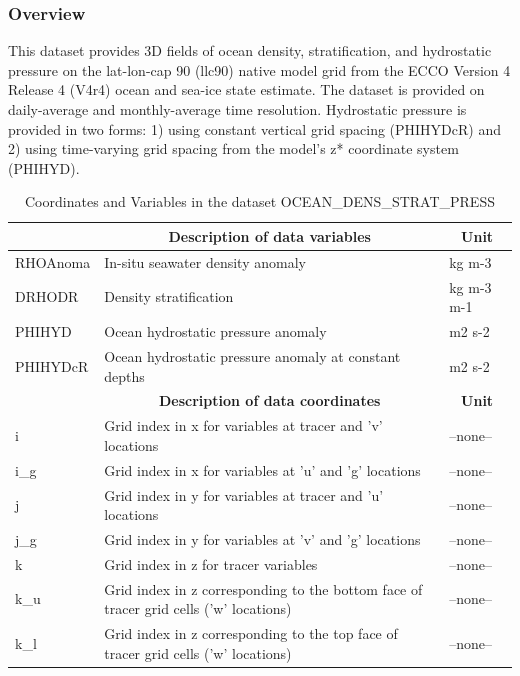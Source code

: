 \subsubsection{Overview}
This dataset provides 3D fields of ocean density, stratification, and hydrostatic pressure on the lat-lon-cap 90 (llc90) native model grid from the ECCO Version 4 Release 4 (V4r4) ocean and sea-ice state estimate. The dataset is provided on daily-average and monthly-average time resolution. Hydrostatic pressure is provided in two forms: 1) using constant vertical grid spacing (PHIHYDcR) and 2) using time-varying grid spacing from the model's z* coordinate system (PHIHYD). 
\begin{longtable}{|m{}|m{}|m{}|}
\caption{Coordinates and Variables in the dataset OCEAN\_DENS\_STRAT\_PRESS}
\label{tab:table-OCEAN_DENS_STRAT_PRESS-fields} \\ 
\hline \endhead \hline \endfoot
\rowcolor{lightgray} \multicolumn{1}{|c|}{\textbf{Variables}} & \multicolumn{1}{|c|}{\textbf{Description of data variables}} &  \multicolumn{1}{|c|}{\textbf{Unit}}\\ \hline
RHOAnoma &In-situ seawater density anomaly &kg m-3  \\ \hline
DRHODR &Density stratification &kg m-3 m-1  \\ \hline
PHIHYD &Ocean hydrostatic pressure anomaly &m2 s-2  \\ \hline
PHIHYDcR &Ocean hydrostatic pressure anomaly at constant depths &m2 s-2  \\ \hline
\rowcolor{lightgray} \multicolumn{1}{|c|}{\textbf{Coordinates}} & \multicolumn{1}{|c|}{\textbf{Description of data coordinates}} &  \multicolumn{1}{|c|}{\textbf{Unit}}\\ \hline
i &Grid index in x for variables at tracer and 'v' locations &--none--  \\ \hline
i\_g &Grid index in x for variables at 'u' and 'g' locations &--none--  \\ \hline
j &Grid index in y for variables at tracer and 'u' locations &--none--  \\ \hline
j\_g &Grid index in y for variables at 'v' and 'g' locations &--none--  \\ \hline
k &Grid index in z for tracer variables &--none--  \\ \hline
k\_u &Grid index in z corresponding to the bottom face of tracer grid cells ('w' locations) &--none--  \\ \hline
k\_l &Grid index in z corresponding to the top face of tracer grid cells ('w' locations) &--none--  \\ \hline

\end{longtable}
